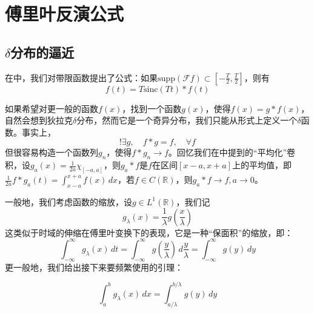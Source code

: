 \section{傅里叶反演公式}\label{sec:Approach}

\subsection{\texorpdfstring{$\delta$分布的逼近}{delta分布的逼近}}\label{sub:approach}
在中，我们对带限函数提出了公式：如果$\mathrm{supp}(\mathcal{F} f)\subset[-\frac{T}{2},\frac{T}{2}]$，则有
\begin{equation*}
    f(t)=T\mathrm{sinc}(Tt)*f(t)
\end{equation*}

如果希望对更一般的函数$f(x)$，找到一个函数$g(x)$，使得$f(x)=g*f(x)$，自然会想到狄拉克$\delta$分布，然而它是一个奇异分布，我们只能从形式上定义一个$\delta$函数。事实上，$$!\exists g,\quad f*g=f,\quad\forall f$$
但很容易构造一个函数列$g_n$，使得$f*g_n\to f$\cite{folland}。回忆我们在中提到的“平均化”卷积，设$g_a(x)=\frac{1}{2a}\chi_{[-a,a]}$，则$g_a*f$是$f$在区间$[x-a,x+a]$上的平均值，即$\frac{1}{2a}f*g_a(t)=\int_{x-a}^{x+a}f(x)\,dx$，若$f\in C(\mathbb{R})$，则$g_a*f\to f,a\to 0$。

一般地，我们考虑函数的缩放，设$g\in L^1(\mathbb{R})$，我们记
\[g_\lambda(x)=\frac{1}{\lambda}g\left(\frac{x}{\lambda}\right)\]
这类似于时域的伸缩在傅里叶变换下的表现，它是一种“保面积”的缩放，即：
\[\int_{-\infty}^{\infty}g_\lambda(x)\,dt=\int_{-\infty}^{\infty}g\left(\frac{y}{\lambda}\right)\,d\frac{y}{\lambda}=\int_{-\infty}^{\infty}g(y)\,dy\]
更一般地，我们给出接下来要频繁使用的引理：\begin{lemma}
    \[\int_{a}^{b}g_\lambda(x)\,dx=\int_{a/\lambda}^{b/\lambda}g(y)\,dy\]
\end{lemma}

